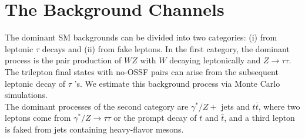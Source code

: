 \section{The Background Channels}
The dominant SM backgrounds can be divided into two categories: (i) from leptonic $\tau$ decays and (ii) from fake leptons. In the first category, the dominant process is the pair production of $W Z$ with $W$ decaying leptonically and $Z \rightarrow \tau \tau$. The trilepton final states with no-OSSF pairs can arise from the subsequent leptonic decay of $\tau$ 's. We estimate this background process via Monte Carlo simulations.
\\
The dominant processes of the second category are $\gamma^{*} / Z+$ jets and $t \bar{t}$, where two leptons come from $\gamma^{*} / Z \rightarrow \tau \tau$ or the prompt decay of $t$ and $\bar{t}$, and a third lepton is faked from jets containing heavy-flavor mesons.
